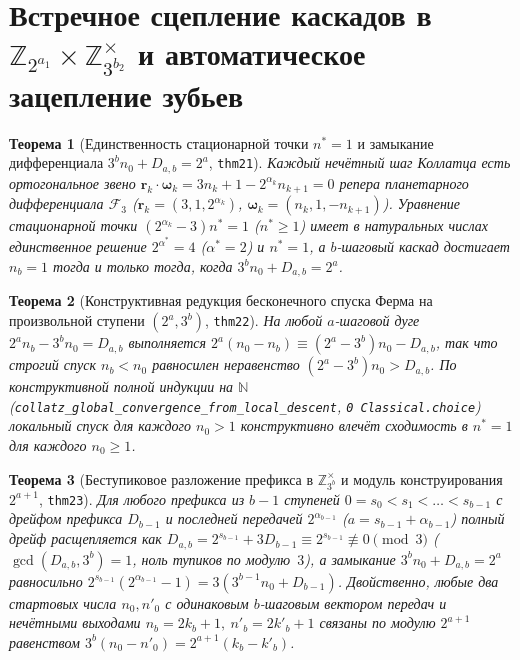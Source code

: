 \documentclass[11pt,a4paper]{article}
\newtheorem{theorem}{Теорема}[section]
\theoremstyle{definition}
\theoremstyle{remark}
\begin{document}
\section{Встречное сцепление каскадов в $\mathbb{Z}_{2^{a_1}} \times \mathbb{Z}_{3^{b_2}}^\times$ и автоматическое зацепление зубьев}
\label{sec:planetary-splice}

\begin{theorem}[Единственность стационарной точки $n^* = 1$ и замыкание дифференциала $3^b n_0 + D_{a,b} = 2^a$, \texttt{thm21}]
\label{thm:planetary-stationary-point}
Каждый нечётный шаг Коллатца есть ортогональное звено $\mathbf{r}_k \cdot \mathbf{\omega}_k = 3 n_k + 1 - 2^{\alpha_k} n_{k+1} = 0$ репера планетарного дифференциала $\mathcal{F}_3$ ($\mathbf{r}_k = (3, 1, 2^{\alpha_k})$, $\mathbf{\omega}_k = (n_k, 1, -n_{k+1})$). Уравнение стационарной точки $(2^{\alpha_k} - 3) n^* = 1$ ($n^* \ge 1$) имеет в натуральных числах единственное решение $2^{\alpha^*} = 4$ ($\alpha^* = 2$) и $n^* = 1$, а $b$-шаговый каскад достигает $n_b = 1$ тогда и только тогда, когда $3^b n_0 + D_{a,b} = 2^a$.
\end{theorem}

\begin{theorem}[Конструктивная редукция бесконечного спуска Ферма на произвольной ступени $(2^a, 3^b)$, \texttt{thm22}]
\label{thm:fermat-descent-reduction}
На любой $a$-шаговой дуге $2^a n_b - 3^b n_0 = D_{a,b}$ выполняется $2^a(n_0 - n_b) \equiv (2^a - 3^b) n_0 - D_{a,b}$, так что строгий спуск $n_b < n_0$ равносилен неравенство $(2^a - 3^b) n_0 > D_{a,b}$. По конструктивной полной индукции на $\mathbb{N}$ (\texttt{collatz\_global\_convergence\_from\_local\_descent}, \texttt{0 Classical.choice}) локальный спуск для каждого $n_0 > 1$ конструктивно влечёт сходимость в $n^* = 1$ для каждого $n_0 \ge 1$.
\end{theorem}

\begin{theorem}[Беступиковое разложение префикса в $\mathbb{Z}_{3^b}^\times$ и модуль конструирования $2^{a+1}$, \texttt{thm23}]
\label{thm:ternary-prefix-closure}
Для любого префикса из $b - 1$ ступеней $0 = s_0 < s_1 < \dots < s_{b-1}$ с дрейфом префикса $D_{b-1}$ и последней передачей $2^{\alpha_{b-1}}$ ($a = s_{b-1} + \alpha_{b-1}$) полный дрейф расщепляется как $D_{a,b} = 2^{s_{b-1}} + 3 D_{b-1} \equiv 2^{s_{b-1}} \not\equiv 0 \pmod 3$ ($\gcd(D_{a,b}, 3^b) = 1$, ноль тупиков по модулю~$3$), а замыкание $3^b n_0 + D_{a,b} = 2^a$ равносильно $2^{s_{b-1}}(2^{\alpha_{b-1}} - 1) = 3(3^{b-1} n_0 + D_{b-1})$. Двойственно, любые два стартовых числа $n_0, n'_0$ с одинаковым $b$-шаговым вектором передач и нечётными выходами $n_b = 2 k_b + 1,\ n'_b = 2 k'_b + 1$ связаны по модулю $2^{a+1}$ равенством $3^b(n_0 - n'_0) = 2^{a+1}(k_b - k'_b)$.
\end{theorem}
\end{document}
